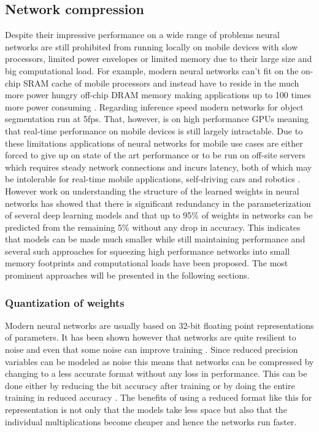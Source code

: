 \documentclass{kththesis}
\newcommand{\bibentry}[1]{\parencite{#1}}
\begin{document}
  \subsection{Network compression}
Despite their impressive performance on a wide range of problems neural networks
are still prohibited from running locally on mobile devices with slow
processors, limited power envelopes or limited memory due to their large size
and big computational load. For example, modern neural networks can't fit on the
on-chip SRAM cache of mobile processors and instead have to reside in the much more power hungry
off-chip DRAM memory making applications up to 100 times more power consuming
\bibentry{han2015learning}. Regarding inference speed modern networks
for object segmentation \bibentry{he2017mask} run at 5fps. That, however, is on high
performance GPUs meaning that real-time performance on mobile devices is still
largely intractable. Due to
these limitations applications of neural networks for mobile use cases are
either forced to give up on state of the art performance or to be run on
off-site servers which requires steady network connections and incurs latency,
both of which may be intolerable for real-time mobile applications, self-driving
cars and robotics \bibentry{jin2014flattened}. However work on understanding the
structure of the learned weights in neural networks
\bibentry{denil2013predicting} has showed that there is significant redundancy
in the parameterization of several deep learning models and that up to 95\% of
weights in networks can be predicted from the remaining 5\% without any drop in
accuracy. This indicates that models can be made much smaller while still
maintaining performance and several such approaches for squeezing high
performance networks into small memory footprints and computational loads have
been proposed. The most prominent approaches will be presented in the following
sections.  

\subsubsection{Quantization of weights}
Modern neural networks are usually based on 32-bit floating point
representations of parameters. It has been shown however that networks are quite
resilient to noise and even that some noise can improve training
\bibentry{murray1994enhanced}. Since reduced precision variables can be modeled
as noise this means that networks can be compressed by changing to a less
accurate format without any loss in performance. This can be done either by
reducing the bit accuracy after training \bibentry{vanhoucke2011improving}  or
by doing the entire training in reduced accuracy \bibentry{hubara2016quantized}
\bibentry{gupta2015deep}. The benefits of using a reduced format like this for
representation is not only that the models take less space but also that the
individual multiplications become cheaper and hence the networks run faster. 
\end{document}
